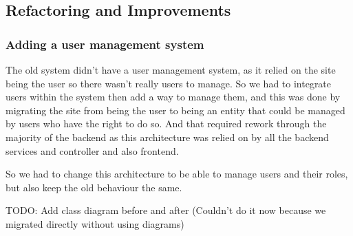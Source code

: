 \subsection {Refactoring and Improvements}

\subsubsection {Adding a user management system}

The old system didn't have a user management system, as it relied on the site being the
user so there wasn't really users to manage. So we had to integrate users within the system
then add a way to manage them, and this was done by migrating the site from being the user
to being an entity that could be managed by users who have the right to do so.
And that required rework through the majority of the backend as this architecture was
relied on by all the backend services and controller and also frontend.

So we had to change this architecture to be able to manage users and their roles, but also
keep the old behaviour the same.

TODO: Add class diagram before and after (Couldn't do it now because we migrated directly without using diagrams)
